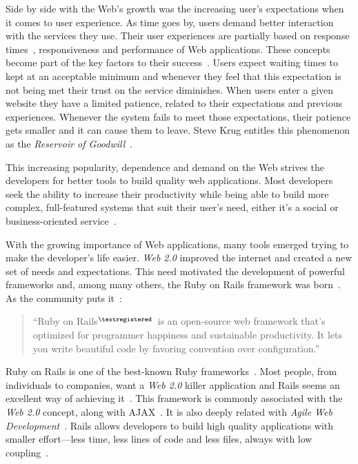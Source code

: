 Side by side with the Web's growth was the increasing user's expectations when it comes to user experience. As time goes by, users demand better interaction with the services they use. Their user experiences are partially based on response times~\cite{prioritizing_web_usability}, responsiveness and performance of Web applications. These concepts become part of the key factors to their success~\cite{responsiveness}. Users expect waiting times to kept at an acceptable minimum and whenever they feel that this expectation is not being met their trust on the service diminishes. When users enter a given website they have a limited patience, related to their expectations and previous experiences. Whenever the system fails to meet those expectations, their patience gets smaller and it can cause them to leave. Steve Krug entitles this phenomenon as the \textit{Reservoir of Goodwill}~\cite{dont_make_me_think}.

This increasing popularity, dependence and demand on the Web strives the developers for better tools to build quality web applications. Most developers seek the ability to increase their productivity while being able to build more complex, full-featured systems that suit their user's need, either it's a social or business-oriented service~\cite{comparison_agile_frameworks}.

With the growing importance of Web applications, many tools emerged trying to make the developer's life easier. \textit{Web 2.0} improved the internet and created a new set of needs and expectations. This need motivated the development of powerful frameworks and, among many others, the Ruby on Rails framework was born~\cite{what_is_web20}. As the community puts it~\cite{rubyonrails}:
\begin{quote}
  ``Ruby on Rails$^{\scriptsize \textregistered}$~is an open-source web framework that's optimized for programmer happiness and sustainable productivity. It lets you write beautiful code by favoring convention over configuration.''
\end{quote}
Ruby on Rails is one of the best-known Ruby frameworks~\cite{agile_webdevelopment_with_rails}. Most people, from individuals to companies, want a \textit{Web 2.0} killer application and Rails seems an excellent way of achieving it~\cite{oo_business_models}. This framework is commonly associated with the \textit{Web 2.0} concept, along with AJAX~\cite{spaghetti_code}. It is also deeply related with \textit{Agile Web Development}~\cite{agile_webdevelopment_with_rails}. Rails allows developers to build high quality applications with smaller effort---less time, less lines of code and less files, always with low coupling~\cite{maintainability_web_applications_j2ee_dotnet_ror}.


